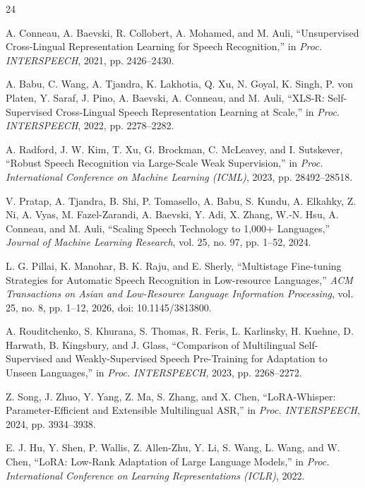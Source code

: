 \documentclass[conference]{IEEEtran}
\begin{document}
\begin{thebibliography}{24}

A. Conneau, A. Baevski, R. Collobert, A. Mohamed, and M. Auli,
``Unsupervised Cross-Lingual Representation Learning for Speech
Recognition,'' in \emph{Proc. INTERSPEECH}, 2021, pp. 2426--2430.

A. Babu, C. Wang, A. Tjandra, K. Lakhotia, Q. Xu, N. Goyal,
K. Singh, P. von Platen, Y. Saraf, J. Pino, A. Baevski, A. Conneau, and
M. Auli, ``XLS-R: Self-Supervised Cross-Lingual Speech Representation
Learning at Scale,'' in \emph{Proc. INTERSPEECH}, 2022, pp. 2278--2282.

A. Radford, J. W. Kim, T. Xu, G. Brockman, C. McLeavey, and
I. Sutskever, ``Robust Speech Recognition via Large-Scale Weak
Supervision,'' in \emph{Proc. International Conference on Machine
Learning (ICML)}, 2023, pp. 28492--28518.

V. Pratap, A. Tjandra, B. Shi, P. Tomasello, A. Babu, S. Kundu,
A. Elkahky, Z. Ni, A. Vyas, M. Fazel-Zarandi, A. Baevski, Y. Adi,
X. Zhang, W.-N. Hsu, A. Conneau, and M. Auli, ``Scaling Speech
Technology to 1{,}000+ Languages,'' \emph{Journal of Machine Learning
Research}, vol. 25, no. 97, pp. 1--52, 2024.

L. G. Pillai, K. Manohar, B. K. Raju, and E. Sherly, ``Multistage
Fine-tuning Strategies for Automatic Speech Recognition in Low-resource
Languages,'' \emph{ACM Transactions on Asian and Low-Resource Language
Information Processing}, vol. 25, no. 8, pp. 1--12, 2026,
doi: 10.1145/3813800.

A. Rouditchenko, S. Khurana, S. Thomas, R. Feris, L. Karlinsky,
H. Kuehne, D. Harwath, B. Kingsbury, and J. Glass, ``Comparison of
Multilingual Self-Supervised and Weakly-Supervised Speech Pre-Training
for Adaptation to Unseen Languages,'' in \emph{Proc. INTERSPEECH}, 2023,
pp. 2268--2272.

Z. Song, J. Zhuo, Y. Yang, Z. Ma, S. Zhang, and X. Chen, ``LoRA-Whisper:
Parameter-Efficient and Extensible Multilingual ASR,'' in \emph{Proc.
INTERSPEECH}, 2024, pp. 3934--3938.

E. J. Hu, Y. Shen, P. Wallis, Z. Allen-Zhu, Y. Li, S. Wang, L. Wang, and
W. Chen, ``LoRA: Low-Rank Adaptation of Large Language Models,'' in
\emph{Proc. International Conference on Learning Representations
(ICLR)}, 2022.


\end{thebibliography}
\end{document}
